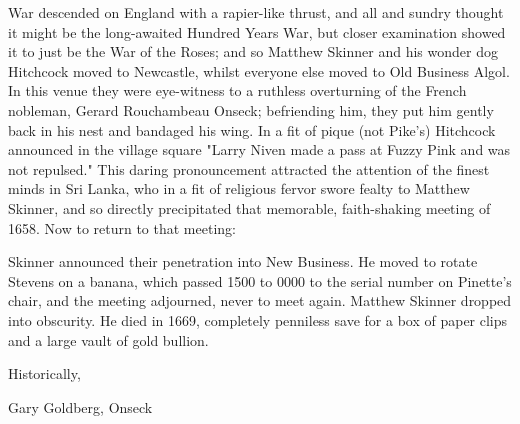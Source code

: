 \documentclass[12pt]{article}
\begin{document}
War descended on England with a rapier-like thrust, and all and sundry thought it might be the long-awaited Hundred Years War, but closer examination showed it to just be the War of the Roses; and so Matthew Skinner and his wonder dog Hitchcock moved to Newcastle, whilst everyone else moved to Old Business Algol. In this venue they were eye-witness to a ruthless overturning of the French nobleman, Gerard Rouchambeau Onseck; befriending him, they put him gently back in his nest and bandaged his wing. In a fit of pique (not Pike's) Hitchcock announced in the village square "Larry Niven made a pass at Fuzzy Pink and was not repulsed." This daring pronouncement attracted the attention of the finest minds in Sri Lanka, who in a fit of religious fervor swore fealty to Matthew Skinner, and so directly precipitated that memorable, faith-shaking meeting of 1658. Now to return to that meeting:

Skinner announced their penetration into New Business. He moved to rotate Stevens on a banana, which passed 1500 to 0000 to the serial number on Pinette's chair, and the meeting adjourned, never to meet again. Matthew Skinner dropped into obscurity. He died in 1669, completely penniless save for a box of paper clips and a large vault of gold bullion.

\vspace{12pt}

\centerline{Historically,}
\centerline{Gary Goldberg, Onseck}
\end{document}
